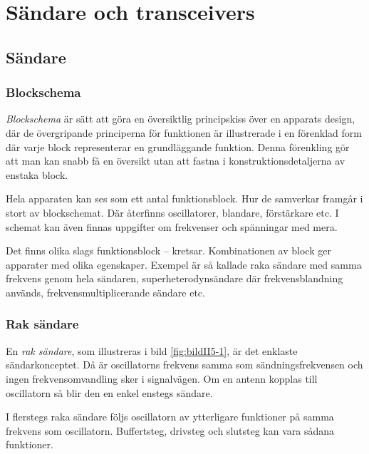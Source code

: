 \chapter[Sändare]{Sändare och transceivers}

\section{Sändare}
\label{sändare}

\subsection{Blockschema}

\emph{Blockschema} är sätt att göra en översiktlig principskiss över en
apparats design, där de övergripande principerna för funktionen är illustrerade
i en förenklad form där varje block representerar en grundläggande funktion.
Denna förenkling gör att man kan snabb få en översikt utan att fastna i
konstruktionsdetaljerna av enstaka block.

Hela apparaten kan ses som ett antal funktionsblock. Hur de samverkar
framgår i stort av blockschemat.
Där återfinns oscillatorer, blandare, förstärkare etc.
I schemat kan även finnas uppgifter om frekvenser och spänningar med mera.

Det finns olika slags funktionsblock -- kretsar. Kombinationen av block
ger apparater med olika egenskaper.
Exempel är så kallade raka sändare med samma frekvens genom hela sändaren,
superheterodynsändare där frekvensblandning används,
frekvensmultiplicerande sändare etc.


\subsection{Rak sändare}

En \emph{rak sändare}, som illustreras i bild \ref{fig:bildII5-1}, är det
enklaste sändarkonceptet.
Då är oscillatorns frekvens samma som sändningsfrekvensen och ingen
frekvensomvandling sker i signalvägen.
Om en antenn kopplas till oscillatorn så blir den en enkel enstegs sändare.

I flerstegs raka sändare följs oscillatorn av ytterligare funktioner
på samma frekvens som oscillatorn.
Buffertsteg, drivsteg och slutsteg kan vara sådana funktioner.

